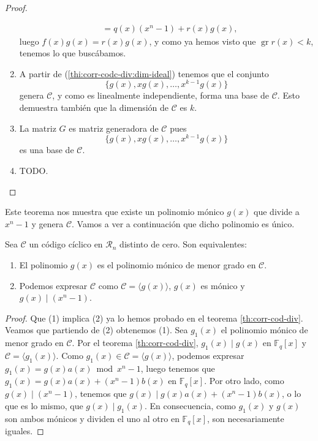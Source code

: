 \begin{proof}
\begin{enumerate}
\begin{align*}
               &= q(x)(x^n - 1) + r(x)g(x),
    \end{align*}
    luego \(f(x)g(x) = r(x)g(x)\), y como ya hemos visto que \(\operatorname{gr} r(x) < k\), tenemos lo que buscábamos.
    \item A partir de (\ref{thi:corr-codc-div:dim-ideal}) tenemos que el conjunto \[\{g(x), xg(x), \dots, x^{k-1}g(x)\}\] genera \(\mathcal C\), y como es linealmente independiente, forma una base de \(\mathcal C\).
    Esto demuestra también que la dimensión de \(\mathcal C\) es \(k\).
    \item La matriz \(G\) es matriz generadora de \(\mathcal C\) pues \[\{g(x), xg(x), \dots, x^{k-1}g(x)\}\] es una base de \(\mathcal C\).
    \item TODO. %
  \end{enumerate}
\end{proof}

Este teorema nos muestra que existe un polinomio mónico \(g(x)\) que divide a \(x^n - 1\) y genera \(\mathcal C\).
Vamos a ver a continuación que dicho polinomio es único.

\begin{corollary}
  Sea \(\mathcal C\) un código cíclico en \(\mathcal R_n\) distinto de cero.
  Son equivalentes:
  \begin{enumerate}
    \item El polinomio \(g(x)\) es el polinomio mónico de menor grado en \(\mathcal C\).
    \item Podemos expresar \(\mathcal C\) como \(\mathcal C = \langle g(x)\rangle\), \(g(x)\) es mónico y \(g(x) \mid (x^n -1)\).
  \end{enumerate}
\end{corollary}

\begin{proof}
  Que (1) implica (2) ya lo hemos probado en el teorema \ref{th:corr-cod-div}. 
  Veamos que partiendo de (2) obtenemos (1). 
  Sea \(g_1(x)\) el polinomio mónico de menor grado en \(\mathcal C\).
  Por el teorema \ref{th:corr-cod-div}, \(g_1(x) \mid g(x)\) en \(\mathbb F_q[x]\) y \(\mathcal C = \langle g_1(x)\rangle\).
  Como \(g_1(x) \in \mathcal C = \langle g(x) \rangle\), podemos expresar \(g_1(x) = g(x)a(x) \bmod x^n - 1\), luego tenemos que \(g_1(x) = g(x)a(x) + (x^n - 1)b(x)\) en \(\mathbb F_q[x]\).
  Por otro lado, como \(g(x) \mid (x^n - 1)\), tenemos que \(g(x) \mid g(x)a(x) + (x^n-1)b(x)\), o lo que es lo mismo, que \(g(x) \mid g_1(x)\). 
  En consecuencia, como \(g_1(x)\) y \(g(x)\) son ambos mónicos y dividen el uno al otro en \(\mathbb F_q[x]\), son necesariamente iguales.
\end{proof}

